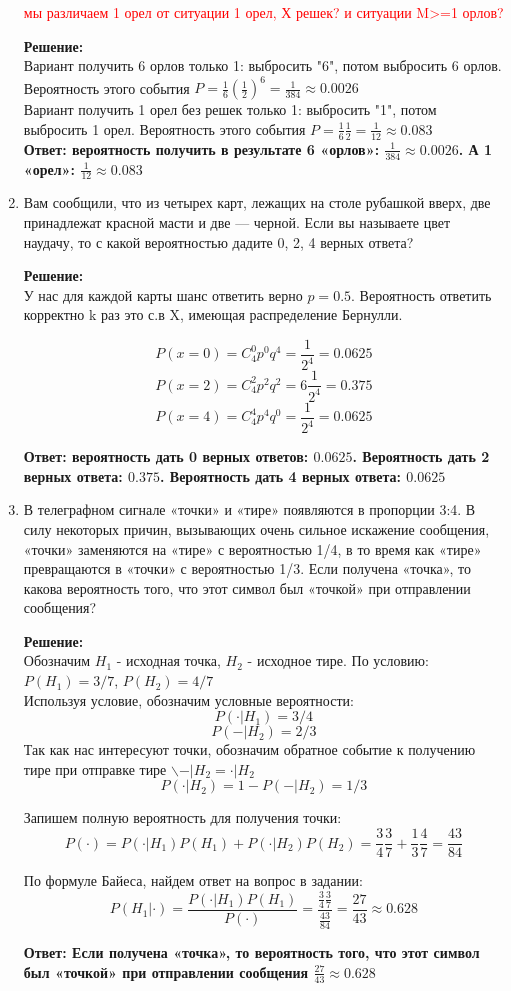 \documentclass[a4paper,12pt]{article}
\begin{document}
\begin{enumerate}
\textcolor{red}{мы различаем 1 орел от ситуации 1 орел, Х решек? и ситуации M>=1 орлов?}

\textbf{Решение:}\\
Вариант получить 6 орлов только 1: выбросить "6", потом выбросить 6 орлов. Вероятность этого события $P = \frac{1}{6}(\frac{1}{2})^6=\frac{1}{384}\approx0.0026$\\
Вариант получить 1 орел без решек только 1: выбросить "1", потом выбросить 1 орел. Вероятность этого события $P = \frac{1}{6}\frac{1}{2}=\frac{1}{12}\approx0.083$\\

\textbf{Ответ: вероятность получить в результате 6 «орлов»: $\frac{1}{384}\approx0.0026$. А 1 «орел»: $\frac{1}{12}\approx0.083$}

\item Вам сообщили, что из четырех карт, лежащих на столе рубашкой вверх, две принадлежат красной масти и две — черной. Если вы называете цвет наудачу, то с какой вероятностью дадите 0, 2, 4 верных ответа?

\textbf{Решение:}\\
У нас для каждой карты шанс ответить верно $p=0.5$. Вероятность ответить корректно k раз это с.в X, имеющая распределение Бернулли.

$$P(x=0) = C_4^0 p^0 q^4 = \frac{1}{2^4}=0.0625$$
$$P(x=2) = C_4^2 p^2 q^2 = 6 \frac{1}{2^4}=0.375$$
$$P(x=4) = C_4^4 p^4 q^0 = \frac{1}{2^4}=0.0625$$

\textbf{Ответ: вероятность дать 0 верных ответов: $0.0625$. Вероятность дать 2 верных ответа: $0.375$. Вероятность дать 4 верных ответа: $0.0625$}

\item В телеграфном сигнале «точки» и «тире» появляются в пропорции 3:4. В силу некоторых причин, вызывающих очень сильное искажение сообщения, «точки» заменяются на «тире» с вероятностью 1/4, в то время как «тире» превращаются в «точки» с вероятностью 1/3. Если получена «точка», то какова вероятность того, что этот символ был «точкой» при отправлении сообщения?

\textbf{Решение:}\\
Обозначим $H_1$ - исходная точка, $H_2$ - исходное тире.
По условию: $P(H_1)=3/7$, $P(H_2)=4/7$\\
Используя условие, обозначим условные вероятности: $$P(\cdot|H_1)=3/4$$
$$P(-|H_2)=2/3$$
Так как нас интересуют точки, обозначим обратное событие к получению тире при отправке тире $ \backslash  {-|H_2}=\cdot|H_2$
$$P(\cdot|H_2)=1-P(-|H_2)=1/3$$

Запишем полную вероятность для получения точки:
$$P(\cdot) = P(\cdot|H_1)P(H_1)+P(\cdot|H_2)P(H_2) = \frac{3}{4}\frac{3}{7}+\frac{1}{3}\frac{4}{7}=\frac{43}{84}$$

По формуле Байеса, найдем ответ на вопрос в задании:
$$P(H_1|\cdot) = \frac{P(\cdot|H_1)P(H_1)}{P(\cdot)}=\frac{\frac{3}{4}\frac{3}{7}}{\frac{43}{84}}=\frac{27}{43}\approx0.628$$

\textbf{Ответ: Если получена «точка», то вероятность того, что этот символ был «точкой» при отправлении сообщения $\frac{27}{43}\approx0.628$}

\end{enumerate}
\end{document}
